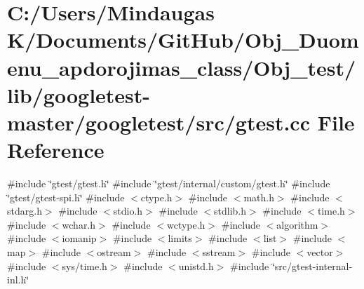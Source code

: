 \hypertarget{_obj__test_2lib_2googletest-master_2googletest_2src_2gtest_8cc}{}\section{C\+:/\+Users/\+Mindaugas K/\+Documents/\+Git\+Hub/\+Obj\+\_\+\+Duomenu\+\_\+apdorojimas\+\_\+class/\+Obj\+\_\+test/lib/googletest-\/master/googletest/src/gtest.cc File Reference}
\label{_obj__test_2lib_2googletest-master_2googletest_2src_2gtest_8cc}
{\ttfamily \#include \char`\"{}gtest/gtest.\+h\char`\"{}}\newline
{\ttfamily \#include \char`\"{}gtest/internal/custom/gtest.\+h\char`\"{}}\newline
{\ttfamily \#include \char`\"{}gtest/gtest-\/spi.\+h\char`\"{}}\newline
{\ttfamily \#include $<$ctype.\+h$>$}\newline
{\ttfamily \#include $<$math.\+h$>$}\newline
{\ttfamily \#include $<$stdarg.\+h$>$}\newline
{\ttfamily \#include $<$stdio.\+h$>$}\newline
{\ttfamily \#include $<$stdlib.\+h$>$}\newline
{\ttfamily \#include $<$time.\+h$>$}\newline
{\ttfamily \#include $<$wchar.\+h$>$}\newline
{\ttfamily \#include $<$wctype.\+h$>$}\newline
{\ttfamily \#include $<$algorithm$>$}\newline
{\ttfamily \#include $<$iomanip$>$}\newline
{\ttfamily \#include $<$limits$>$}\newline
{\ttfamily \#include $<$list$>$}\newline
{\ttfamily \#include $<$map$>$}\newline
{\ttfamily \#include $<$ostream$>$}\newline
{\ttfamily \#include $<$sstream$>$}\newline
{\ttfamily \#include $<$vector$>$}\newline
{\ttfamily \#include $<$sys/time.\+h$>$}\newline
{\ttfamily \#include $<$unistd.\+h$>$}\newline
{\ttfamily \#include \char`\"{}src/gtest-\/internal-\/inl.\+h\char`\"{}}\newline
